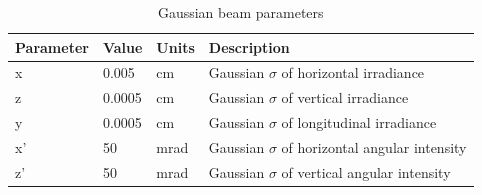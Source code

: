 \documentclass{iucr}
\begin{document}

\begin{table}\label{gaussian_table}
\caption{Gaussian beam parameters}
\begin{tabular}{@{}llll@{}}
Parameter       & Value         & Units     & Description                                           \\
\hline
x               & 0.005         & cm        & Gaussian $\sigma$ of horizontal irradiance            \\
z               & 0.0005        & cm        & Gaussian $\sigma$ of vertical irradiance              \\ 
y               & 0.0005        & cm        & Gaussian $\sigma$ of longitudinal irradiance          \\
x'              & 50            & mrad      & Gaussian $\sigma$ of horizontal angular intensity     \\
z'              & 50            & mrad      & Gaussian $\sigma$ of vertical angular intensity       \\

\end{tabular}
\end{table}
\end{document}
